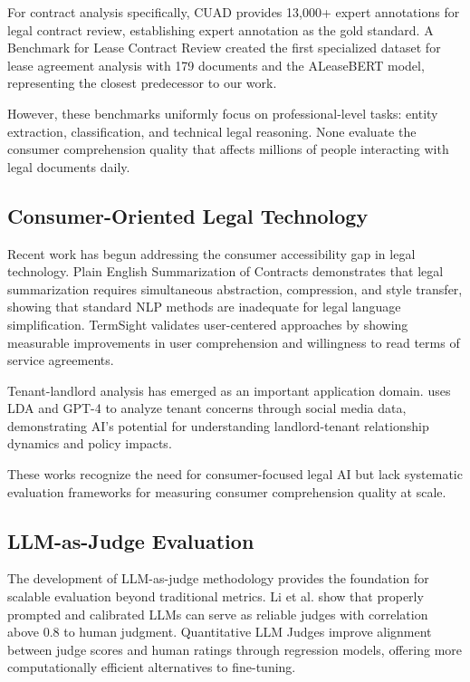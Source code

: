 \documentclass{article}
\begin{document}
For contract analysis specifically, CUAD \cite{hendrycks2021cuad} provides 13,000+ expert annotations for legal contract review, establishing expert annotation as the gold standard. A Benchmark for Lease Contract Review \cite{leivaditi2020benchmark} created the first specialized dataset for lease agreement analysis with 179 documents and the ALeaseBERT model, representing the closest predecessor to our work.

However, these benchmarks uniformly focus on professional-level tasks: entity extraction, classification, and technical legal reasoning. None evaluate the consumer comprehension quality that affects millions of people interacting with legal documents daily.

\subsection{Consumer-Oriented Legal Technology}

Recent work has begun addressing the consumer accessibility gap in legal technology. Plain English Summarization of Contracts \cite{manor2019plain} demonstrates that legal summarization requires simultaneous abstraction, compression, and style transfer, showing that standard NLP methods are inadequate for legal language simplification. TermSight \cite{huang2025termsight} validates user-centered approaches by showing measurable improvements in user comprehension and willingness to read terms of service agreements.

Tenant-landlord analysis has emerged as an important application domain. \cite{ren2024evaluating} uses LDA and GPT-4 to analyze tenant concerns through social media data, demonstrating AI's potential for understanding landlord-tenant relationship dynamics and policy impacts.

These works recognize the need for consumer-focused legal AI but lack systematic evaluation frameworks for measuring consumer comprehension quality at scale.

\subsection{LLM-as-Judge Evaluation}

The development of LLM-as-judge methodology provides the foundation for scalable evaluation beyond traditional metrics. Li et al. \cite{li2024llms} show that properly prompted and calibrated LLMs can serve as reliable judges with correlation above 0.8 to human judgment. Quantitative LLM Judges \cite{sahoo2025quantitative} improve alignment between judge scores and human ratings through regression models, offering more computationally efficient alternatives to fine-tuning.
\end{document}
